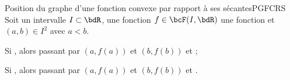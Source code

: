 \documentclass[a4paper,french,bookmarks]{report}
\begin{document}
\begin{lemma}{Position du graphe d'une fonction convexe par rapport à ses sécantes}{PGFCRS}
    Soit un intervalle $I \subset \bdR$, une fonction $f \in \bcF(I, \bdR)$ une fonction et $(a, b) \in I^2$ avec $a < b$.
    
    \begin{enumerate}
        \ithand Si , alors  passant par $\left(a, f(a)\right)$ et $\left(b, f(b)\right)$  et  ;
        
        \ithand Si , alors  passant par $\left(a, f(a)\right)$ et $\left(b, f(b)\right)$  et .
    \end{enumerate}
\end{lemma}
\end{document}
